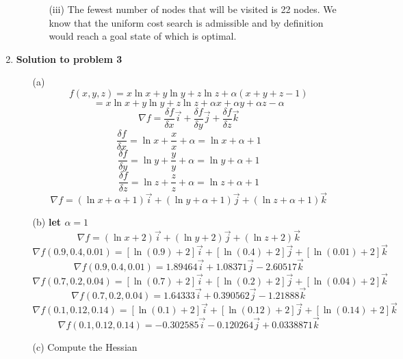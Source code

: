 \begin{enumerate}
\begin{enumerate}
\begin{enumerate}
					\item[(iii)]  The fewest number of nodes that will be visited is 22 nodes.  We know that the uniform cost search is admissible and by definition would reach a goal state of which is optimal.
					
				\end{enumerate}
		\end{enumerate}
		
 	\item {\bf Solution to problem 3}
		\begin{enumerate}
			\item[(a)]  
				\[
				f(x,y,z) = x \ln x + y \ln y + z \ln z + \alpha ( x + y + z - 1)
				\]
				\[
					   = x \ln x + y \ln y + z \ln z + \alpha x + \alpha y + \alpha z - \alpha
				\]
				\[
				\nabla f = \frac{\delta f}{\delta x}\vec{i} + \frac{\delta f}{\delta y}\vec{j} + \frac{\delta f}{\delta z}\vec{k}
				\]
				\[
					\frac{\delta f}{\delta x} = \ln x + \frac{x}{x} + \alpha = \ln x + \alpha + 1
				\]
				\[
					\frac{\delta f}{\delta y} = \ln y + \frac{y}{y} + \alpha = \ln y + \alpha + 1
				\]
				\[
					\frac{\delta f}{\delta z} = \ln z + \frac{z}{z} + \alpha = \ln z + \alpha + 1
				\]
				\[
					\nabla f = (\ln x + \alpha + 1)\vec{i} + (\ln y + \alpha + 1)\vec{j} + (\ln z + \alpha + 1)\vec{k}
				\]
			\item[(b)]
				\bf let \( \alpha = 1 \) 
				\[
					\nabla f = (\ln x + 2)\vec{i} + (\ln y +2)\vec{j} + (\ln z + 2)\vec{k}
				\]
				\vspace*{4mm}
				\[
					\nabla f(0.9,0.4,0.01) = [\ln(0.9) + 2]\vec{i} + [\ln(0.4) + 2]\vec{j} + [\ln(0.01) + 2]\vec{k}
				\]
				\[
					\nabla f(0.9,0.4,0.01) =1.89464\vec{i} + 1.08371\vec{j} - 2.60517\vec{k}
				\]
				\vspace*{4mm}
				\[
					\nabla f(0.7,0.2,0.04) = [\ln(0.7) + 2]\vec{i} + [\ln(0.2) + 2]\vec{j} + [\ln(0.04) + 2]\vec{k}
				\]
				\[
					\nabla f(0.7,0.2,0.04) = 1.64333\vec{i} + 0.390562\vec{j} - 1.21888\vec{k}
				\]
				\vspace*{4mm}
				\[
					\nabla f(0.1,0.12,0.14) = [\ln(0.1) + 2]\vec{i} + [\ln(0.12) + 2]\vec{j} + [\ln(0.14) + 2]\vec{k}
				\]
				\[
					\nabla f(0.1,0.12,0.14) = -0.302585\vec{i} - 0.120264\vec{j} + 0.0338871\vec{k}
				\]
				
			\item[(c)] Compute the Hessian
			

\end{enumerate}
\end{enumerate}

